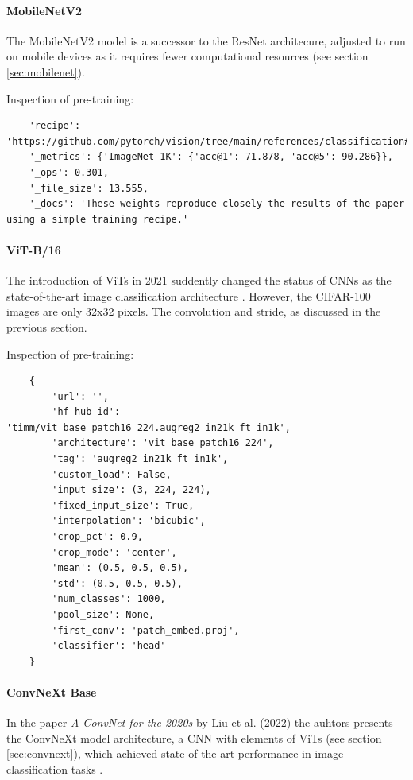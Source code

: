 \paragraph{MobileNetV2}
The MobileNetV2 model  is a successor to the ResNet architecure, adjusted to run on mobile devices as it requires fewer computational resources (see section \ref{sec:mobilenet}).

Inspection of pre-training:
\begin{verbatim}
    'recipe': 'https://github.com/pytorch/vision/tree/main/references/classification#mobilenetv2', 
    '_metrics': {'ImageNet-1K': {'acc@1': 71.878, 'acc@5': 90.286}}, 
    '_ops': 0.301, 
    '_file_size': 13.555, 
    '_docs': 'These weights reproduce closely the results of the paper using a simple training recipe.'
\end{verbatim}
    

\paragraph{ViT-B/16}
The introduction of ViTs in 2021 \cite{dosovitskiy2021imageworth16x16words} suddently changed the status of CNNs as the state-of-the-art image classification architecture \cite{liu2022convnet2020s}. However, the CIFAR-100 images are only 32x32 pixels. The convolution and stride, as discussed in the previous section.

Inspection of pre-training:

\begin{verbatim}
    {
        'url': '', 
        'hf_hub_id': 'timm/vit_base_patch16_224.augreg2_in21k_ft_in1k', 
        'architecture': 'vit_base_patch16_224', 
        'tag': 'augreg2_in21k_ft_in1k', 
        'custom_load': False, 
        'input_size': (3, 224, 224), 
        'fixed_input_size': True, 
        'interpolation': 'bicubic', 
        'crop_pct': 0.9, 
        'crop_mode': 'center', 
        'mean': (0.5, 0.5, 0.5), 
        'std': (0.5, 0.5, 0.5), 
        'num_classes': 1000, 
        'pool_size': None, 
        'first_conv': 'patch_embed.proj', 
        'classifier': 'head'
    }
\end{verbatim}
    


\paragraph{ConvNeXt Base}
In the paper \emph{A ConvNet for the 2020s} by Liu et al. (2022) \cite{liu2022convnet2020s} the auhtors presents the ConvNeXt model architecture, a CNN with elements of ViTs (see section \ref{sec:convnext}), which achieved state-of-the-art performance in image classification tasks . 

